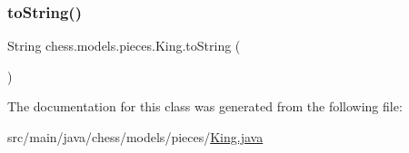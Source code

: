 \subsubsection{\texorpdfstring{to\+String()}{toString()}}
{\footnotesize\ttfamily String chess.\+models.\+pieces.\+King.\+to\+String (\begin{DoxyParamCaption}{ }\end{DoxyParamCaption})}



The documentation for this class was generated from the following file\+:\begin{DoxyCompactItemize}
\item 
src/main/java/chess/models/pieces/\mbox{\hyperlink{_king_8java}{King.\+java}}\end{DoxyCompactItemize}

